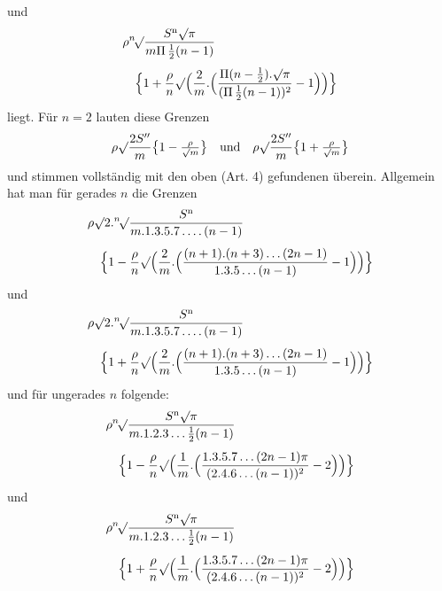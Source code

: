 und
\[
\begin{aligned}
&\rho\BareRoot[n]{\frac{S^{\mathrm n}\surd\pi}{m\Pi\,\frac12(n-1)}}\\[3pt]
&\quad\Bigl\{1+\frac\rho n\surd\Bigl(\frac2m.\Bigl(\frac{\Pi(n-\frac12).\surd\pi}{(\Pi\,\frac12(n-1))^2}-1\Bigr)\Bigr)\Bigr\}
\end{aligned}
\]
liegt. Für \(n=2\) lauten diese Grenzen
\[
\rho\surd\frac{2S''}{m}\bigl\{1-\tfrac\rho{\surd m}\bigr\}\quad\text{und}\quad
\rho\surd\frac{2S''}{m}\bigl\{1+\tfrac\rho{\surd m}\bigr\}
\]
und stimmen vollständig mit den oben (Art. 4) gefundenen überein. Allgemein hat man für gerades \(n\) die Grenzen
\[
\begin{aligned}
&\rho\surd2.\BareRoot[n]{\frac{S^{\mathrm n}}{m.1.3.5.7\, .\,.\,.\,.\,(n-1)}}\\[4pt]
&\quad\Bigl\{1-\frac\rho n\surd\Bigl(\frac2m.\Bigl(\frac{(n+1).(n+3)\, .\,.\,.\,(2n-1)}{1.3.5\, .\,.\,.\,(n-1)}-1\Bigr)\Bigr)\Bigr\}
\end{aligned}
\]
und
\[
\begin{aligned}
&\rho\surd2.\BareRoot[n]{\frac{S^{\mathrm n}}{m.1.3.5.7\, .\,.\,.\,.\,(n-1)}}\\[4pt]
&\quad\Bigl\{1+\frac\rho n\surd\Bigl(\frac2m.\Bigl(\frac{(n+1).(n+3)\, .\,.\,.\,(2n-1)}{1.3.5\, .\,.\,.\,(n-1)}-1\Bigr)\Bigr)\Bigr\}
\end{aligned}
\]
und für ungerades \(n\) folgende:
\[
\begin{aligned}
&\rho\BareRoot[n]{\frac{S^{\mathrm n}\surd\pi}{m.1.2.3\, .\,.\,.\,\frac12(n-1)}}\\[4pt]
&\quad\Bigl\{1-\frac\rho n\surd\Bigl(\frac1m.\Bigl(\frac{1.3.5.7\, .\,.\,.\,(2n-1)\pi}{(2.4.6\, .\,.\,.\,(n-1))^2}-2\Bigr)\Bigr)\Bigr\}
\end{aligned}
\]
und
\[
\begin{aligned}
&\rho\BareRoot[n]{\frac{S^{\mathrm n}\surd\pi}{m.1.2.3\, .\,.\,.\,\frac12(n-1)}}\\[4pt]
&\quad\Bigl\{1+\frac\rho n\surd\Bigl(\frac1m.\Bigl(\frac{1.3.5.7\, .\,.\,.\,(2n-1)\pi}{(2.4.6\, .\,.\,.\,(n-1))^2}-2\Bigr)\Bigr)\Bigr\}
\end{aligned}
\]

